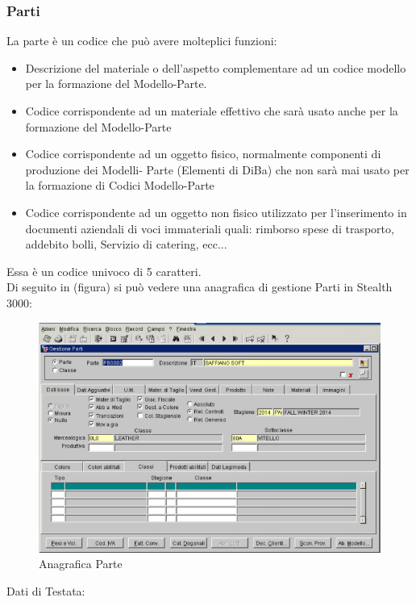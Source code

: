 \subsubsection{Parti}
La parte è un codice che può avere molteplici funzioni:
\begin{itemize}
\item Descrizione del materiale o dell’aspetto complementare ad un codice modello per la formazione del Modello-Parte.

\item Codice corrispondente ad un materiale effettivo che sarà usato anche per la formazione del Modello-Parte

\item Codice corrispondente ad un oggetto fisico, normalmente componenti di produzione dei Modelli- Parte (Elementi di DiBa) che non sarà mai usato per la formazione di Codici Modello-Parte

\item Codice corrispondente ad un oggetto non fisico utilizzato per l’inserimento in documenti aziendali di voci immateriali quali: rimborso spese di trasporto, addebito bolli, Servizio di catering, ecc...
\end{itemize}
Essa è un codice univoco di 5 caratteri.\\
Di seguito in (figura) si può vedere una anagrafica di gestione Parti in Stealth 3000:

\begin{figure}[!h]
\thispagestyle{empty}
\centering
\includegraphics[scale=0.90]{img/Parte.png}
\caption{Anagrafica Parte}
\end{figure}
\newpage


Dati di Testata:

